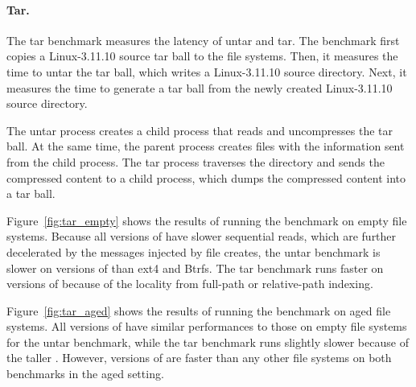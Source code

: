 \paragraph{Tar.}

The tar benchmark measures the latency of untar and tar.
The benchmark first copies a Linux-3.11.10 source tar ball to the file systems.
Then, it measures the time to untar the tar ball, which writes a Linux-3.11.10
source directory.
Next, it measures the time to generate a tar ball from the newly created
Linux-3.11.10 source directory.

The untar process creates a child process that reads and uncompresses the tar
ball.
At the same time, the parent process creates files with the information sent
from the child process.
The tar process traverses the directory and sends the compressed content to
a child process, which dumps the compressed content into a tar ball.

Figure~\ref{fig:tar_empty} shows the results of running the benchmark on empty
file systems.
Because all versions of \betrfs have slower sequential reads, which are further
decelerated by the messages injected by file creates,
the untar benchmark is slower on versions of \betrfs than ext4 and Btrfs.
The tar benchmark runs faster on versions of \betrfs because of the locality
from full-path or relative-path indexing.

Figure~\ref{fig:tar_aged} shows the results of running the benchmark on aged
file systems.
All versions of \betrfs have similar performances to those on empty file systems
for the untar benchmark, while the tar benchmark runs slightly slower because
of the taller \bets.
However, versions of \betrfs are faster than any other file systems on both
benchmarks in the aged setting.

